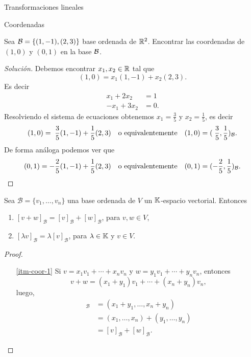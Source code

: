 \begin{chapter}{Transformaciones lineales}
\begin{section}{Coordenadas}
    \begin{ejemplo*}
        Sea $\mathcal{B} = \{(1,-1),(2,3)\}$ base ordenada de $\mathbb R^2$. Encontrar las coordenadas  de $(1,0)$ y $(0,1)$ en la base $\mathcal{B}$.
    \end{ejemplo*}
    \begin{proof}[Solución] Debemos encontrar $x_1, x_2 \in \mathbb R$ tal que 
        $$
        (1,0) = x_1(1,-1)+ x_2(2,3).
        $$
        Es decir 
        \begin{align*}
            x_1+ 2x_2 &= 1\\
            -x_1 + 3x_2 &= 0.
        \end{align*}
        Resolviendo el sistema de ecuaciones obtenemos $x_1 = \frac35$ y $x_2 = \frac15$,  es decir
        $$
        (1,0) =\; \frac35(1,-1)+ \frac15(2,3)\quad \text{o equivalentemente} \quad (1,0) = (\;\frac35,\frac15)_{\mathcal{B}}.
        $$ 
        De forma análoga podemos ver que
        $$
        (0,1) = -\frac25(1,-1)+ \frac15(2,3)\quad \text{o equivalentemente} \quad (0,1) = (-\frac25,\frac15)_{\mathcal{B}}.
        $$
    \end{proof}
    
    \begin{proposicion}\label{vectorbase->lineal}
        Sea $\mathcal{B}=\{v_1,\ldots,v_n\}$ una base ordenada de $V$ un $\mathbb K$-espacio vectorial. Entonces
        \begin{enumerate}
            \item\label{itm-coor-1} $[v + w]_\mathcal{B} = [v]_\mathcal{B} +[w]_\mathcal{B}$, para $v,w \in V$,
            \item\label{itm-coor-2} $[\lambda v]_\mathcal{B} = \lambda[v]_\mathcal{B}$, para $\lambda \in \mathbb K$ y $v \in V$.
        \end{enumerate}
    \end{proposicion} 
    \begin{proof}${}^{}$
        \begin{enumerate}
            \item[\ref{itm-coor-1}] Si $v = x_1v_1 + \cdots +x_nv_n$ y $w = y_1v_1 + \cdots +y_nv_n$, entonces 
            $$
            v + w = (x_1+y_1)v_1 + \cdots +(x_n+y_n)v_n,
            $$
            luego,
            \begin{align*}
                [v + w]_\mathcal{B} &=(x_1+y_1,\ldots ,x_n+y_n) \\
                &= (x_1,\ldots, x_n) +(y_1,\ldots , y_n) \\
                &= [v]_\mathcal{B} +[w]_\mathcal{B}.
            \end{align*}
                    

\end{enumerate}
\end{proof}
\end{section}
\end{chapter}
